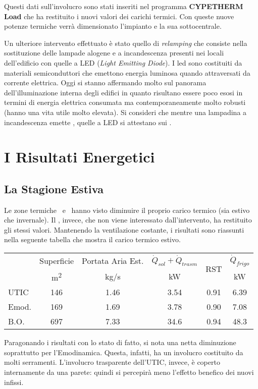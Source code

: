 Questi dati sull'involucro sono stati inseriti nel programma \textbf{CYPETHERM Load} che ha restituito i nuovi valori dei carichi termici. Con queste nuove potenze termiche verrà dimensionato l'impianto e la sua sottocentrale.

Un ulteriore intervento effettuato è stato quello di \emph{relamping} che consiste nella sostituzione delle lampade alogene e a incandescenza presenti nei locali dell'edificio con quelle a LED (\emph{Light Emitting Diode}). I led sono costituiti da materiali semiconduttori che emettono energia luminosa quando attraversati da corrente elettrica. Oggi si stanno affermando molto sul panorama dell'illuminazione interna degli edifici in quanto risultano essere poco esosi in termini di energia elettrica consumata ma contemporaneamente molto robusti (hanno una vita utile molto elevata). Si consideri che mentre una lampadina a incandescenza emette , quelle a LED si attestano sui .
\section{I Risultati Energetici}
\subsection{La Stagione Estiva}
Le zone termiche \utic\ e \emod\ hanno visto diminuire il proprio carico termico (sia estivo che invernale). Il \blocc, invece, che non viene interessato dall'intervento, ha restituito gli stessi valori. Mantenendo la ventilazione costante, i risultati sono riassunti nella seguente tabella che mostra il carico termico estivo.
\begin{center}
	\begin{tabular}{lccccc}
		\toprule
		&	Superficie 				&	Portata Aria Est. 			&	$\dot{Q}_{sol}+\dot{Q}_{trasm}$		& 	\multirow{2}{*}{RST}		&	$\dot{Q}_{frigo}$ 	\\
		&	{\small \si{m^2}}		&		{\small \si{kg/s}}		&		{\small \si{kW}}				&								&{\small \si{kW}}		\\					
		\midrule	
		UTIC		&		\num{146}			&		\num{1.46}				&	\num{3.54}		&	\num{0.91}					&	\num{6.39}		\\
		Emod.		&		\num{169}			&		\num{1.69}				&	\num{3.78}		&	\num{0.90}					&	\num{7.08}		\\
		B.O.		&		\num{697}			&		\num{7.33}				&	\num{34.6}		&	\num{0.94}					&	\num{48.3}		\\
		\bottomrule
	\end{tabular}
\end{center}
Paragonando i risultati con lo stato di fatto, si nota una netta diminuzione soprattutto per l'Emodinamica. Questa, infatti, ha un involucro costituito da molti serramenti. L'involucro trasparente dell'UTIC, invece, è coperto internamente da una parete: quindi si percepirà meno l'effetto benefico dei nuovi infissi.

